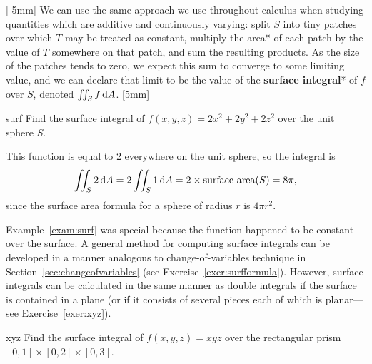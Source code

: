 \documentclass[svgnames]{watsonbook}
\begin{document}
[-5mm]
We can use the same approach we use throughout calculus when studying
quantities which are additive and continuously varying: split $S$ into
tiny patches over which $T$ may be treated as constant,
multiply the area* of each patch by the value of $T$ somewhere on that patch, and
sum the resulting products. As the size of the patches tends to zero,
we expect this sum to converge to some limiting value, and we can
declare that limit to be the value of the \textbf{surface integral}* of $f$ over
$S$, denoted $\iint_S f \, {\mathrm{d}}A$. [5mm]

\begin{example}{}{surf}
  Find the surface integral of $f(x,y,z) = 2x^2 +2y^2 + 2z^2$ over the
  unit sphere $S$. 
\end{example}

\begin{solution}
  This function is equal to 2 everywhere on the unit sphere, so the
  integral is
  \[
    \iint_{S} 2 \,\mathrm{d} A =     2 \iint_{S} 1 \,\mathrm{d} A = 2 \times \text{surface
      area}(S) = 8\pi, 
  \]
  since the surface area formula for a sphere of radius $r$ is $4\pi
  r^2$. 
\end{solution}

Example~\ref{exam:surf} was special because the function happened to
be constant over the surface. A general method for computing surface
integrals can be developed in a manner analogous to
change-of-variables technique in
Section~\ref{sec:changeofvariables} (see Exercise~\ref{exer:surfformula}).
However, surface integrals can be
calculated in the same manner as double integrals if the surface is
contained in a plane (or if it consists of several pieces each of
which is planar---see Exercise~\ref{exer:xyz}). 

\begin{exercise}{}{xyz}
  Find the surface integral of $f(x,y,z) = xyz$ over the rectangular
  prism $[0,1] \times [0,2] \times [0,3]$. 
\end{exercise}
\end{document}
